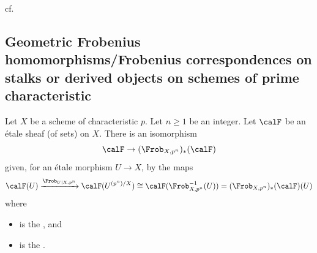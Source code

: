 cf. \cite[XV]{sga5} \cite[10.3]{fu_ect}






\subsection{Geometric Frobenius homomorphisms/Frobenius correspondences on stalks or derived objects on schemes of prime characteristic}

\begin{lemma} \label{lemma:there_is_an_isomorphism_from_an_etale_sheaf_on_a_scheme_of_characteristic_p_to_its_pushforward_under_frobenius}
    Let $X$ be a scheme of characteristic $p$. Let $n \geq 1$ be an integer. Let $\calF$ be an \'etale sheaf (of sets) on $X$. 
    There is an isomorphism 
    $$\calF \to (\Frob_{X,p^n})_*(\calF)$$
    given, for an \'etale morphism $U \to X$, by the maps
    $$\calF(U) \xrightarrow{\Frob_{U|X, p^n}} \calF(U^{(p^n)/X}) \cong \calF(\Frob_{X,p^n}^{-1}(U)) = (\Frob_{X,p^n})_*(\calF)(U)$$
    where 
    \begin{itemize}
    \item {} is the , and
    \item {} is the .
    \end{itemize}
\end{lemma}

